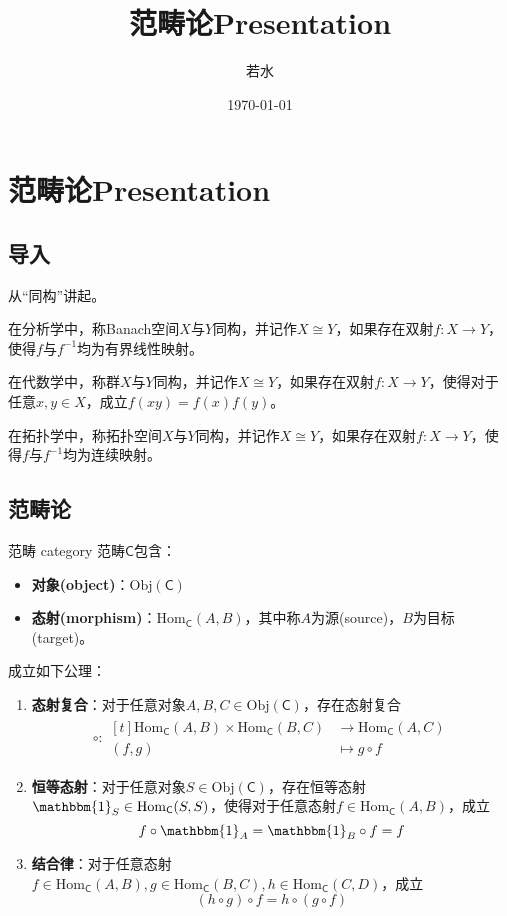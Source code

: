 \documentclass[lang = cn, scheme = chinese, thmcnt = section]{elegantbook}
\title{范畴论Presentation}                %
\author{若水}               %
\date{\today}               %
\begin{document}
\maketitle       %

\frontmatter     %

\tableofcontents %

\mainmatter      %

\chapter{范畴论Presentation}

\section{导入}

从“同构”讲起。

在分析学中，称Banach空间$X$与$Y$同构，并记作$X\cong Y$，如果存在双射$f:X\to Y$，使得$f$与$f^{-1}$均为有界线性映射。

在代数学中，称群$X$与$Y$同构，并记作$X\cong Y$，如果存在双射$f:X\to Y$，使得对于任意$x,y\in X$，成立$f(xy)=f(x)f(y)$。

在拓扑学中，称拓扑空间$X$与$Y$同构，并记作$X\cong Y$，如果存在双射$f:X\to Y$，使得$f$与$f^{-1}$均为连续映射。

\section{范畴论}

\begin{definition}{范畴 category}
	范畴$\mathsf{C}$包含：
	\begin{itemize}
		\item {\bf 对象(object)}：$\mathrm{Obj}(\mathsf{C})$
		\item {\bf 态射(morphism)}：$\mathrm{Hom}_\mathsf{C}(A,B)$，其中称$A$为源(source)，$B$为目标(target)。
	\end{itemize}
	成立如下公理：
	\begin{enumerate}
		\item {\bf 态射复合}：对于任意对象$A,B,C\in\mathrm{Obj}(\mathsf{C})$，存在态射复合
		\begin{align*}
			\circ :\begin{aligned}[t]
				\mathrm{Hom}_\mathsf{C}(A,B)\times \mathrm{Hom}_\mathsf{C}(B,C)&\longrightarrow \mathrm{Hom}_\mathsf{C}(A,C)\\
				(f,g)&\longmapsto g\circ f
			\end{aligned}
		\end{align*}
		\item {\bf 恒等态射}：对于任意对象$S\in\mathrm{Obj}(\mathsf{C})$，存在恒等态射$\mathbbm{1}_S\in\mathrm{Hom}_\mathsf{C}(S,S)$，使得对于任意态射$f\in \mathrm{Hom}_\mathsf{C}(A,B)$，成立
		$$
		f\circ\mathbbm{1}_A=\mathbbm{1}_B\circ f=f
		$$
		\item {\bf 结合律}：对于任意态射$f\in \mathrm{Hom}_\mathsf{C}(A,B),g\in \mathrm{Hom}_\mathsf{C}(B,C),h\in \mathrm{Hom}_\mathsf{C}(C,D)$，成立
		$$
		(h\circ g)\circ f=h\circ (g\circ f)
		$$
	\end{enumerate}
\end{definition}
\end{document}
